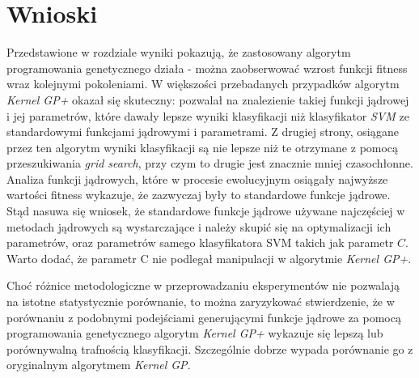 \section{Wnioski}
Przedstawione w rozdziale wyniki pokazują, że zastosowany algorytm programowania genetycznego działa - można zaobserwować wzrost funkcji fitness wraz kolejnymi pokoleniami. W większości przebadanych przypadków algorytm \emph{Kernel GP+} okazał się skuteczny: pozwalał na znalezienie takiej funkcji jądrowej i jej parametrów, które dawały lepsze wyniki klasyfikacji niż klasyfikator \emph{SVM} ze standardowymi funkcjami jądrowymi i parametrami. Z drugiej strony, osiągane przez ten algorytm wyniki klasyfikacji są nie lepsze niż te otrzymane z pomocą przeszukiwania \emph{grid search}, przy czym to drugie jest znacznie mniej czasochłonne. Analiza funkcji jądrowych, które w procesie ewolucyjnym osiągały najwyższe wartości fitness wykazuje, że zazwyczaj były to standardowe funkcje jądrowe. Stąd nasuwa się wniosek, że standardowe funkcje jądrowe używane najczęściej w metodach jądrowych są wystarczające i należy skupić się na optymalizacji ich parametrów, oraz parametrów samego klasyfikatora SVM takich jak parametr $ C $. Warto dodać, że parametr C nie podlegał manipulacji w algorytmie \emph{Kernel GP+}.

Choć różnice metodologiczne w przeprowadzaniu eksperymentów nie pozwalają na istotne statystycznie porównanie, to można zaryzykować stwierdzenie, że w porównaniu z podobnymi podejściami generującymi funkcje jądrowe za pomocą programowania genetycznego algorytm \emph{Kernel GP+} wykazuje się lepszą lub porównywalną trafnością klasyfikacji. Szczególnie dobrze wypada porównanie go z oryginalnym algorytmem \emph{Kernel GP}.

\clearpage
